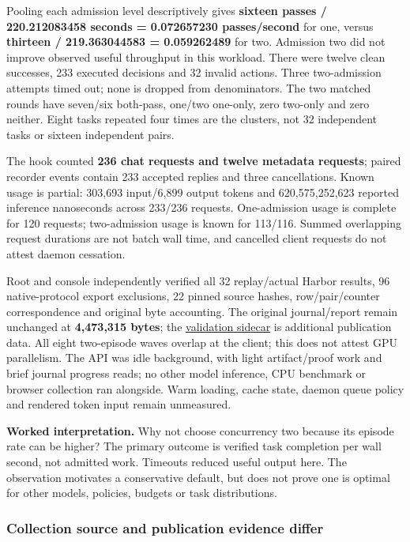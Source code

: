 \documentclass[
  11pt,
  letterpaper,
]{article}
\newcounter{none} %
\begin{document}
Pooling each admission level descriptively gives \textbf{sixteen passes
/ 220.212083458 seconds = 0.072657230 passes/second} for one, versus
\textbf{thirteen / 219.363044583 = 0.059262489} for two. Admission two
did not improve observed useful throughput in this workload. There were
twelve clean successes, 233 executed decisions and 32 invalid actions.
Three two-admission attempts timed out; none is dropped from
denominators. The two matched rounds have seven/six both-pass, one/two
one-only, zero two-only and zero neither. Eight tasks repeated four
times are the clusters, not 32 independent tasks or sixteen independent
pairs.

The hook counted \textbf{236 chat requests and twelve metadata
requests}; paired recorder events contain 233 accepted replies and three
cancellations. Known usage is partial: 303,693 input/6,899 output tokens
and 620,575,252,623 reported inference nanoseconds across 233/236
requests. One-admission usage is complete for 120 requests;
two-admission usage is known for 113/116. Summed overlapping request
durations are not batch wall time, and cancelled client requests do not
attest daemon cessation.

Root and console independently verified all 32 replay/actual Harbor
results, 96 native-protocol export exclusions, 22 pinned source hashes,
row/pair/counter correspondence and original byte accounting. The
original journal/report remain unchanged at \textbf{4,473,315 bytes};
the
\href{../../artifacts/model-concurrency-study/20261010-v1/independent-validation.json}{validation
sidecar} is additional publication data. All eight two-episode waves
overlap at the client; this does not attest GPU parallelism. The API was
idle background, with light artifact/proof work and brief journal
progress reads; no other model inference, CPU benchmark or browser
collection ran alongside. Warm loading, cache state, daemon queue policy
and rendered token input remain unmeasured.

\textbf{Worked interpretation.} Why not choose concurrency two because
its episode rate can be higher? The primary outcome is verified task
completion per wall second, not admitted work. Timeouts reduced useful
output here. The observation motivates a conservative default, but does
not prove one is optimal for other models, policies, budgets or task
distributions.

\subsubsection{Collection source and publication evidence
differ}\label{collection-source-and-publication-evidence-differ}
\end{document}
